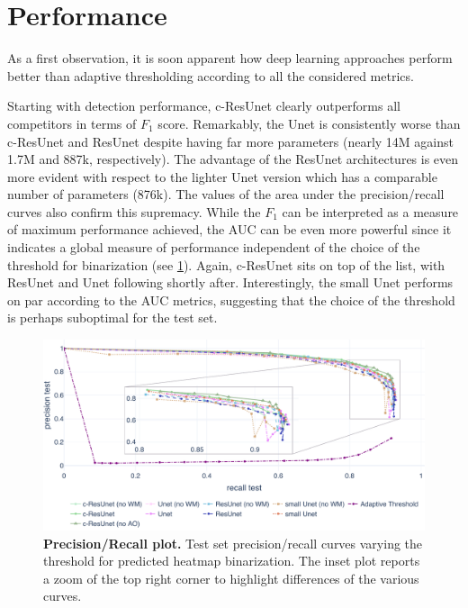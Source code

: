 \section{Performance}

As a first observation, it is soon apparent how deep learning approaches perform better than adaptive thresholding according to all the considered metrics.

Starting with detection performance,
c-ResUnet clearly outperforms all competitors in terms of $F_1$ score.
Remarkably, the Unet is consistently worse than c-ResUnet and ResUnet despite having far more parameters (nearly 14M against 1.7M and 887k, respectively).
The advantage of the ResUnet architectures is even more evident with respect to the lighter Unet version which has a comparable number of parameters (876k).
The values of the area under the precision/recall curves also confirm this supremacy. While the $F_1$ can be interpreted as a measure of maximum performance achieved, the AUC can be even more powerful since it indicates a global measure of performance independent of the choice of the threshold for binarization (see \cref{fig:results:PR}). Again, c-ResUnet sits on top of the list, with ResUnet and Unet following shortly after. Interestingly, the small Unet performs on par according to the AUC metrics, suggesting that the choice of the threshold is perhaps suboptimal for the test set.
\begin{figure}
    \centering
    \includegraphics[width=\textwidth]{figures/140_results/PR_test.pdf}
    \caption{\textbf{Precision/Recall plot.} 
    Test set precision/recall curves varying the threshold for predicted heatmap binarization. The inset plot reports a zoom of the top right corner to highlight differences of the various curves.}
    \label{fig:results:PR}
\end{figure}

